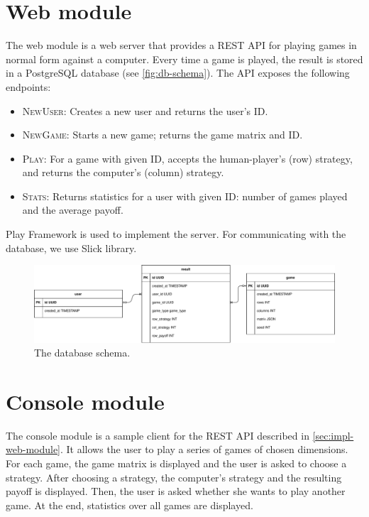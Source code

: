 \section{Web module}
\label{sec:impl-web-module}
The web module is a web server that provides a REST API for playing games in normal form against a computer.
Every time a game is played, the result is stored in a PostgreSQL database (see \autoref{fig:db-schema}).
The API exposes the following endpoints:
\begin{itemize}
	\item \textsc{NewUser}: Creates a new user and returns the user's ID.
	\item \textsc{NewGame}: Starts a new game; returns the game matrix and ID.
	\item \textsc{Play}: For a game with given ID, accepts the human-player's (row) strategy, and returns the computer's (column) strategy.
	\item \textsc{Stats}: Returns statistics for a user with given ID: number of games played and the average payoff.
\end{itemize}

Play Framework is used to implement the server.
For communicating with the database, we use Slick library.

\begin{figure}
	\hspace{-1cm}
	\includegraphics[width=14cm]{fig/schema.pdf}
	\caption{The database schema.}
	\label{fig:db-schema}
\end{figure}

\section{Console module}
The console module is a sample client for the REST API described in \autoref{sec:impl-web-module}.
It allows the user to play a series of games of chosen dimensions.
For each game, the game matrix is displayed and the user is asked to choose a strategy.
After choosing a strategy, the computer's strategy and the resulting payoff is displayed.
Then, the user is asked whether she wants to play another game.
At the end, statistics over all games are displayed.

